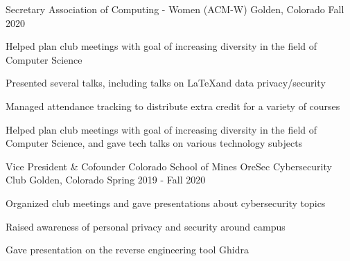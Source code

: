 \vspace{-2.0mm}

\begin{cventries}


\cventry
  {Secretary}
  {Association of Computing - Women (ACM-W)}
  {Golden, Colorado}
  {Fall 2020}
  {
    \begin{cvitems}
      \ifcv
      \item {Helped plan club meetings with goal of increasing diversity in the field of Computer Science}
      \item {Presented several talks, including talks on \LaTeX and data privacy/security} %
      \item {Managed attendance tracking to distribute extra credit for a variety of courses}
      \else
      \item {Helped plan club meetings with goal of increasing diversity in the field of Computer Science, and gave tech talks on various technology subjects} %
      \fi
    \end{cvitems}
  }
  {}

  \cventry
    {Vice President \& Cofounder} %
    {Colorado School of Mines OreSec Cybersecurity Club} %
    {Golden, Colorado} %
    {Spring 2019 - Fall 2020} %
    {
      \begin{cvitems} %
        \item {Organized club meetings and gave presentations about
            cybersecurity topics}
          \ifcv
        \item {Raised awareness of personal privacy and security around campus}
        \item {Gave presentation on the reverse engineering tool Ghidra}
        \fi
      \end{cvitems}
    }
    {}



\end{cventries}
